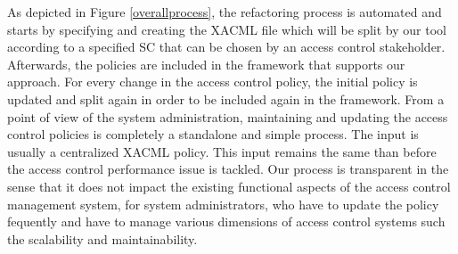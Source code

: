 As depicted in Figure \ref{overallprocess}, the refactoring process is automated and starts by specifying and creating the XACML file which 
will be split by our tool according to a specified SC that can be chosen by an access control stakeholder. Afterwards, the policies are included in the 
framework that supports our approach. For every change in the access control policy, the initial policy is updated and 
split again in order to be included again in the framework.
From a point of view of the system administration, maintaining and updating the access control policies is completely a standalone and simple
 process. The input is usually a centralized XACML policy. This input remains the same than before the access control performance issue is tackled.
Our process is transparent in the sense that it does not impact the existing functional aspects of the access control management system, 
for system administrators, who have to update the policy fequently and have to manage various dimensions of access control 
systems such the scalability and maintainability.